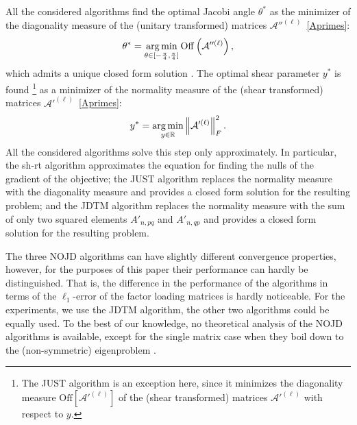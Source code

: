 \documentclass{article}
\newcommand{\norm}[1]{\left\|#1\right\|}
\newcommand{\rbra}[1]{\left(#1\right)}
\newcommand{\off}{\mathrm{Off}}
\def\argmin{\mathop{\rm arg\,min}\limits}
\newcommand{\R}{\mathbb{R}}
\newcommand{\acal}{\mathcal{A}}
\begin{document}
All the considered algorithms find the optimal Jacobi angle $\theta^*$ as the minimizer of the diagonality measure of the (unitary transformed) matrices $\acal''^{(\ell)}$~\eqref{Aprimes}:
\begin{equation}\label{unitary-opt}
\theta^* = \argmin_{\theta\in[-\frac{\pi}{4}, \frac{ \pi}{4}]} \off \rbra{ \acal''^{(\ell)} },
\end{equation}
which admits a unique closed form solution \citep{CarSou1996}.
The optimal shear parameter $y^*$ is found%
\footnote{The JUST algorithm is an exception here, since it minimizes the diagonality measure $\off[{ \acal'^{(\ell)}}]$ of the (shear transformed) matrices $\acal'^{(\ell)}$ with respect to $y$.
}
as a minimizer of the normality measure of the (shear transformed) matrices $\acal'^{(\ell)}$~\eqref{Aprimes}:
\begin{equation}\label{shear-opt}
y^* = \argmin_{y\in\R} \norm{\acal'^{(\ell)}}_F^2.
\end{equation}
All the considered algorithms \citep{FuGao2006,IfeEtAl2009,LucAlb2010} solve this step only approximately. In particular, the sh-rt algorithm \citep{FuGao2006} approximates the equation for finding the nulls of the gradient of the objective; the JUST algorithm \citep{IfeEtAl2009} replaces the normality measure with the diagonality measure and provides a closed form solution for the resulting problem; and the JDTM algorithm \citep{LucAlb2010} replaces the normality measure with the sum of only two squared elements $A'_{n,pq}$ and $A'_{n,qp}$ and provides a closed form solution for the resulting problem.

The three NOJD algorithms can have slightly different convergence properties, however, for the purposes of this paper their performance can hardly be distinguished. That is, the difference in the performance of the algorithms in terms of the $\ell_1$-error of the factor loading matrices is hardly noticeable. For the experiments, we use the JDTM algorithm, the other two algorithms could be equally used. To the best of our knowledge, no theoretical analysis of the NOJD algorithms is available, except for the single matrix case when they boil down to the (non-symmetric) eigenproblem \citep{Ebe1962,Ruh1968}.
\end{document}
